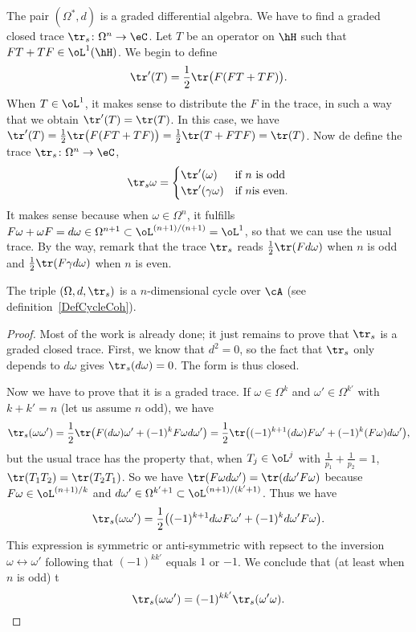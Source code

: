 The pair $(\Omega^*,d)$ is a graded differential algebra. We have to find a graded closed trace $\tr_s\colon \Omega^n\to \eC$. Let $T$ be an operator on $\hH$ such that $FT+TF\in\oL^1(\hH)$. We begin to define
\[
	\tr'(T)=\frac{ 1 }{2}\tr\big( F(FT+TF) \big).
\]
When $T\in\oL^1$, it makes sense to distribute the $F$ in the trace, in such a way that we obtain $\tr'(T)=\tr(T)$. In this case, we have
$\tr'(T)=\frac{ 1 }{2}\tr\big( F(FT+TF) \big)=\frac{ 1 }{2}\tr(T+FTF)=\tr(T)$.
Now de define the trace $\tr_s\colon \Omega^n\to \eC$,
\[
	\tr_s\omega=
	\begin{cases}
		\tr'(\omega)       & \text{if }n \text{ is odd}  \\
		\tr'(\gamma\omega) & \text{if }n \text{is even}.
	\end{cases}
\]
It makes sense because when $\omega\in\Omega^n$, it fulfills $F\omega+\omega F=d\omega\in\Omega^{n+1}\subset\oL^{(n+1)/(n+1)}=\oL^1$, so that we can use the usual trace. By the way, remark that the trace $\tr_s$ reads $\frac{ 1 }{2}\tr(Fd\omega)$ when $n$ is odd and $\frac{ 1 }{2}\tr(F\gamma d\omega)$ when $n$ is even.

\begin{proposition}
	The triple $(\Omega,d,\tr_s)$ is a $n$-dimensional cycle over  $\cA$ (see definition~\ref{DefCycleCoh}).
\end{proposition}

\begin{proof}
	Most of the work is already done; it just remains to prove that $\tr_s$ is a graded closed trace. First, we know that $d^2=0$, so the fact that $\tr_s$ only depends to $d\omega$ gives $\tr_s(d\omega)=0$. The form is thus closed.

	Now we have to prove that it is a graded trace. If $\omega\in\Omega^k$ and $\omega'\in\Omega^{k'}$ with $k+k'=n$ (let us assume $n$ odd), we have
	\[
		\tr_s(\omega\omega')=\frac{ 1 }{2}\tr\big( F(d\omega)\omega'+(-1)^{k}F\omega d\omega' \big)=\frac{ 1 }{2}\tr\big( (-1)^{k+1}(d\omega)F\omega'+(-1)^k(F\omega)d\omega' \big),
	\]
	but the usual trace has the property that, when $T_j\in\oL^j$ with $\frac{1}{ p_1 }+\frac{1}{ p_2 }=1$, $\tr(T_1T_2)=\tr(T_2T_1)$. So we have $\tr(F\omega d\omega')=\tr(d\omega'F\omega)$ because $F\omega\in\oL^{(n+1)/  k }$ and $d\omega'\in\Omega^{k'+1}\subset\oL^{(n+1)/(k'+1)}$. Thus we have
	\[
		\tr_s(\omega\omega')=\frac{ 1 }{2}\big( (-1)^{k+1}d\omega F\omega'+(-1)^kd\omega' F\omega \big).
	\]
	This expression is symmetric or anti-symmetric with repsect to the inversion $\omega\leftrightarrow\omega'$ following that $(-1)^{kk'}$ equals $1$ or $-1$. We conclude that (at least when $n$ is odd) t
	\[
		\tr_s(\omega\omega')=(-1)^{kk'}\tr_s(\omega'\omega).
	\]
\end{proof}

